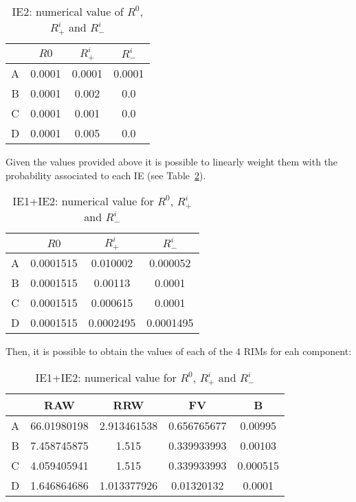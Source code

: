\begin{table}[h!]
  \centering
  \caption{IE2: numerical value of $R^0$, $R^i_+$ and $R^i_-$}
  \label{tab:RIM_IE2_num}
  \begin{tabular}{c|ccc}
    \toprule
    & $R0$ & $R^i_+$ & $R^i_-$ \\
    \midrule
    A & 0.0001 & 0.0001 & 0.0001 \\
    B & 0.0001 & 0.002  & 0.0    \\
    C & 0.0001 & 0.001  & 0.0    \\
    D & 0.0001 & 0.005  & 0.0    \\
    \bottomrule
  \end{tabular}
\end{table}

Given the values provided above it is possible to linearly weight them with the probability associated to each IE (see Table~\ref{tab:RIM_IE12}).

\begin{table}[h!]
  \centering
  \caption{IE1+IE2: numerical value for $R^0$, $R^i_+$ and $R^i_-$}
  \label{tab:RIM_IE12}
  \begin{tabular}{c|ccc}
    \toprule
    & $R0$ & $R^i_+$ & $R^i_-$ \\
    \midrule
    A & 0.0001515 & 0.010002  & 0.000052  \\
    B & 0.0001515 & 0.00113   & 0.0001    \\
    C & 0.0001515 & 0.000615  & 0.0001    \\
    D & 0.0001515 & 0.0002495 & 0.0001495 \\
    \bottomrule
  \end{tabular}
\end{table}

Then, it is possible to obtain the values of each of the 4 RIMs for eah component:

\begin{table}[h!]
  \centering
  \caption{IE1+IE2: numerical value for $R^0$, $R^i_+$ and $R^i_-$}
  \label{tab:table1}
  \begin{tabular}{c|cccc}
    \toprule
    & RAW & RRW & FV & B \\
    \midrule
    A & 66.01980198 & 2.913461538 & 0.656765677 & 0.00995  \\
    B & 7.458745875 & 1.515       & 0.339933993 & 0.00103  \\
    C & 4.059405941 & 1.515       & 0.339933993 & 0.000515 \\
    D & 1.646864686 & 1.013377926 & 0.01320132  & 0.0001   \\
    \bottomrule
  \end{tabular}
\end{table}

